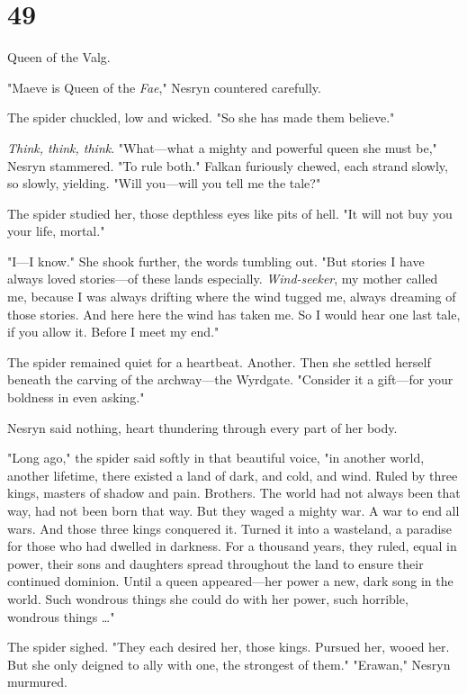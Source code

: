 
\chapter{49}

Queen of the Valg.

"Maeve is Queen of the \emph{Fae}," Nesryn countered carefully.

The spider chuckled, low and wicked.
"So she has made them believe."

\emph{Think, think, think}.
"What---what a mighty and powerful queen she must be," Nesryn stammered.
"To rule both."
Falkan furiously chewed, each strand slowly, so slowly, yielding.
"Will you---will you tell me the tale?"

The spider studied her, those depthless eyes like pits of hell.
"It will not buy you your life, mortal."

"I---I know."
She shook further, the words tumbling out.
"But stories  I have always loved stories---of these lands especially.
\emph{Wind-seeker}, my mother called me, because I was always drifting where the wind tugged me, always dreaming of those stories.
And here  here the wind has taken me.
So I would hear one last tale, if you allow it.
Before I meet my end."

The spider remained quiet for a heartbeat.
Another.
Then she settled herself beneath the carving of the archway---the Wyrdgate.
"Consider it a gift---for your boldness in even asking."

Nesryn said nothing, heart thundering through every part of her body.

"Long ago," the spider said softly in that beautiful voice, "in another world, another lifetime, there existed a land of dark, and cold, and wind.
Ruled by three kings, masters of shadow and pain.
Brothers.
The world had not always been that way, had not been born that way.
But they waged a mighty war.
A war to end all wars.
And those three kings conquered it.
Turned it into a wasteland, a paradise for those who had dwelled in darkness.
For a thousand years, they ruled, equal in power, their sons and daughters spread throughout the land to ensure their continued dominion.
Until a queen appeared---her power a new, dark song in the world.
Such wondrous things she could do with her power, such horrible, wondrous things \ldots"

The spider sighed.
"They each desired her, those kings.
Pursued her, wooed her.
But she only deigned to ally with one, the strongest of them."
"Erawan," Nesryn murmured.

